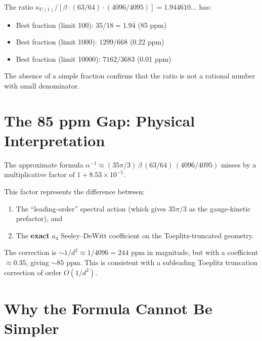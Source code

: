 \documentclass[11pt,a4paper]{article}
\theoremstyle{definition}
\begin{document}
The ratio $\kappa_{U(1)}/[\beta \cdot (63/64) \cdot (4096/4095)]
= 1.944610\ldots$ has:
\begin{itemize}
\item Best fraction (limit 100): $35/18 = 1.9\overline{4}$
\quad (85 ppm)
\item Best fraction (limit 1000): $1299/668$
\quad (0.22 ppm)
\item Best fraction (limit 10000): $7162/3683$
\quad (0.01 ppm)
\end{itemize}
The absence of a simple fraction confirms that the ratio is not
a rational number with small denominator.

\section{The 85 ppm Gap: Physical Interpretation}

The approximate formula $\alpha^{-1} \approx (35\pi/3)\,\beta\,(63/64)\,(4096/4095)$
misses by a multiplicative factor of $1 + 8.53 \times 10^{-5}$.

This factor represents the difference between:
\begin{enumerate}
\item The ``leading-order'' spectral action (which gives $35\pi/3$ as the
gauge-kinetic prefactor), and
\item The \textbf{exact} $a_4$ Seeley--DeWitt coefficient on the
Toeplitz-truncated geometry.
\end{enumerate}

The correction is $\sim 1/d^2 \approx 1/4096 = 244$ ppm in magnitude, but
with a coefficient $\approx 0.35$, giving $\sim 85$ ppm.  This is consistent
with a subleading Toeplitz truncation correction of order $O(1/d^2)$.

\section{Why the Formula Cannot Be Simpler}
\end{document}
